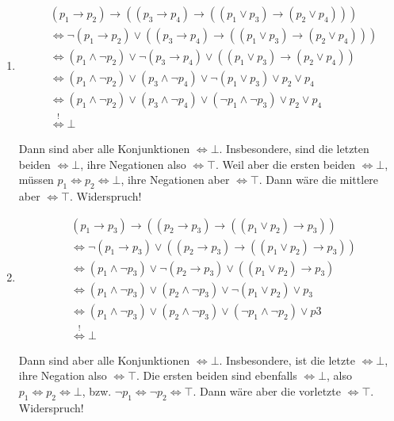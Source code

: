 \begin{solution}

\phantom{}

\begin{enumerate}[label = \alph*.]

  \item
  
  \begin{align*}
    & (p_1 \to p_2) \to ((p_3 \to p_4) \to ((p_1 \lor p_3) \to (p_2 \lor p_4))) \\
    & \iff
    \neg (p_1 \to p_2) \lor ((p_3 \to p_4) \to ((p_1 \lor p_3) \to (p_2 \lor p_4))) \\
    & \iff
    (p_1 \land \neg p_2) \lor \neg (p_3 \to p_4) \lor ((p_1 \lor p_3) \to (p_2 \lor p_4)) \\
    & \iff
    (p_1 \land \neg p_2) \lor (p_3 \land \neg p_4) \lor \neg (p_1 \lor p_3) \lor p_2 \lor p_4 \\
    & \iff
    (p_1 \land \neg p_2) \lor (p_3 \land \neg p_4) \lor (\neg p_1 \land \neg p_3) \lor p_2 \lor p_4 \\
    & \stackrel{!}{\iff} \bot
  \end{align*}

  Dann sind aber alle Konjunktionen $\iff \bot$.
  Insbesondere, sind die letzten beiden $\iff \bot$, ihre Negationen also $\iff \top$.
  Weil aber die ersten beiden $\iff \bot$, müssen $p_1 \iff p_2 \iff \bot$, ihre Negationen aber $\iff \top$.
  Dann wäre die mittlere aber $\iff \top$.
  Widerspruch!

  \item

  \begin{align*}
    & (p_1 \to p_3) \to ((p_2 \to p_3) \to ((p_1 \lor p_2) \to p_3)) \\
    & \iff
    \neg (p_1 \to p_3) \lor ((p_2 \to p_3) \to ((p_1 \lor p_2) \to p_3)) \\
    & \iff
    (p_1 \land \neg p_3) \lor \neg (p_2 \to p_3) \lor ((p_1 \lor p_2) \to p_3) \\
    & \iff
    (p_1 \land \neg p_3) \lor (p_2 \land \neg p_3) \lor \neg (p_1 \lor p_2) \lor p_3 \\
    & \iff
    (p_1 \land \neg p_3) \lor (p_2 \land \neg p_3) \lor (\neg p_1 \land \neg p_2) \lor p3 \\
    & \stackrel{!}{\iff} \bot
  \end{align*}

  Dann sind aber alle Konjunktionen $\iff \bot$.
  Insbesondere, ist die letzte $\iff \bot$, ihre Negation also $\iff \top$.
  Die ersten beiden sind ebenfalls $\iff \bot$, also $p_1 \iff p_2 \iff \bot$, bzw. $\neg p_1 \iff \neg p_2 \iff \top$.
  Dann wäre aber die vorletzte $\iff \top$.
  Widerspruch!


\end{enumerate}
\end{solution}
